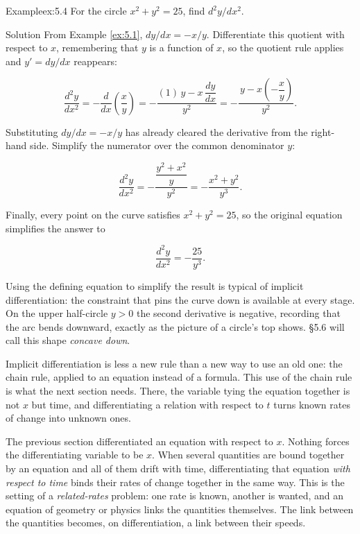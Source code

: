 \documentclass[a4paper,12pt,oneside]{memoir}
\begin{document}
\begin{workedexample}
\begin{envexample}{Example}{ex:5.4}{}
For the circle \(x^{2} + y^{2} = 25\), find \(d^{2}y/dx^{2}\).
\end{envexample}
\begin{envsolution}{Solution}{}{}
From Example \ref{ex:5.1}, \(dy/dx = -x/y\). Differentiate this quotient with respect to \(x\), remembering that \(y\) is a function of \(x\), so the quotient rule applies and \(y' = dy/dx\) reappears:

\[ \frac{d^{2}y}{dx^{2}} = -\frac{d}{dx}\!\left(\frac{x}{y}\right) = -\frac{(1)\,y - x\,\dfrac{dy}{dx}}{y^{2}} = -\frac{\,y - x\!\left(-\dfrac{x}{y}\right)}{y^{2}}. \]

Substituting \(dy/dx = -x/y\) has already cleared the derivative from the right-hand side. Simplify the numerator over the common denominator \(y\):

\[ \frac{d^{2}y}{dx^{2}} = -\frac{\dfrac{y^{2} + x^{2}}{y}}{y^{2}} = -\frac{x^{2} + y^{2}}{y^{3}}. \]

Finally, every point on the curve satisfies \(x^{2} + y^{2} = 25\), so the original equation simplifies the answer to

\[ \frac{d^{2}y}{dx^{2}} = -\frac{25}{y^{3}}. \]

Using the defining equation to simplify the result is typical of implicit differentiation: the constraint that pins the curve down is available at every stage. On the upper half-circle \(y > 0\) the second derivative is negative, recording that the arc bends downward, exactly as the picture of a circle’s top shows. §5.6 will call this shape \emph{concave down}. \qedmark
\end{envsolution}
\end{workedexample}
Implicit differentiation is less a new rule than a new way to use an old one: the chain rule, applied to an equation instead of a formula. This use of the chain rule is what the next section needs. There, the variable tying the equation together is not \(x\) but time, and differentiating a relation with respect to \(t\) turns known rates of change into unknown ones.


The previous section differentiated an equation with respect to \(x\). Nothing forces the differentiating variable to be \(x\). When several quantities are bound together by an equation and all of them drift with time, differentiating that equation \emph{with respect to time} binds their rates of change together in the same way. This is the setting of a \emph{related-rates} problem: one rate is known, another is wanted, and an equation of geometry or physics links the quantities themselves. The link between the quantities becomes, on differentiation, a link between their speeds.
\end{document}
